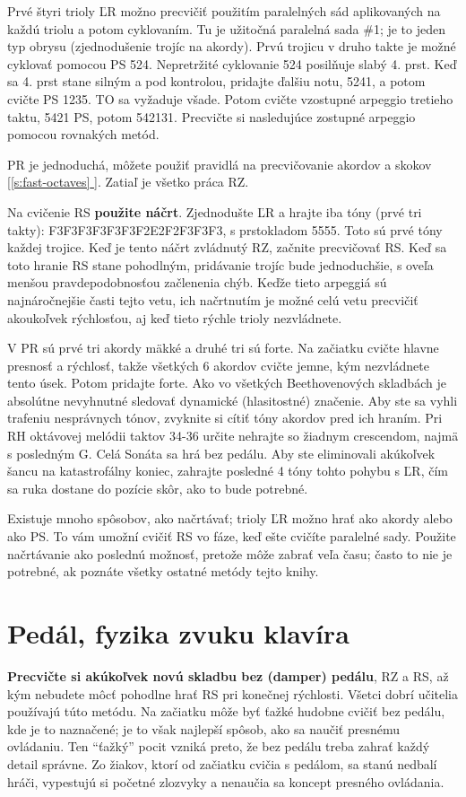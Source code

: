 \documentclass[11pt,a4paper]{book}
\newcommand*{\fullref}[1]{\hyperref[{#1}]{\ref*{#1} \nameref*{#1}}} %
\newcommand*{\fullrefp}[1]{[\fullref{#1}]} %
\begin{document}
Prvé štyri trioly ĽR možno precvičiť použitím paralelných sád aplikovaných na každú triolu a potom cyklovaním. Tu je užitočná paralelná sada \#1; je to jeden typ obrysu (zjednodušenie trojíc na akordy). Prvú trojicu v druho  takte je možné cyklovať pomocou PS 524. Nepretržité cyklovanie 524 posilňuje slabý 4. prst. Keď sa 4. prst stane silným a pod kontrolou, pridajte ďalšiu notu, 5241, a potom cvičte PS 1235. TO sa vyžaduje všade. Potom cvičte vzostupné arpeggio tretieho taktu, 5421 PS, potom 542131. Precvičte si nasledujúce zostupné arpeggio pomocou rovnakých metód.

PR je jednoduchá, môžete použiť pravidlá na precvičovanie akordov a skokov \fullrefp{s:fast-octaves}. Zatiaľ je všetko práca RZ.

Na cvičenie RS \textbf{použite náčrt}. Zjednodušte ĽR a hrajte iba tóny (prvé tri takty): F3F3F3F3\textbar F3F3F2E2\textbar F2F3F3F3, s prstokladom 5555. Toto sú prvé tóny každej trojice. Keď je tento náčrt zvládnutý RZ, začnite precvičovať RS. Keď sa toto hranie RS stane pohodlným, pridávanie trojíc bude jednoduchšie, s oveľa menšou pravdepodobnosťou začlenenia chýb. Keďže tieto arpeggiá sú najnáročnejšie časti tejto vetu, ich načrtnutím je možné celú vetu precvičiť akoukoľvek rýchlosťou, aj keď tieto rýchle trioly nezvládnete.

V PR sú prvé tri akordy mäkké a druhé tri sú forte. Na začiatku cvičte hlavne presnosť a rýchlosť, takže všetkých 6 akordov cvičte jemne, kým nezvládnete tento úsek. Potom pridajte forte. Ako vo všetkých Beethovenových skladbách je absolútne nevyhnutné sledovať dynamické (hlasitostné) značenie. Aby ste sa vyhli trafeniu nesprávnych tónov, zvyknite si cítiť tóny akordov pred ich hraním. Pri RH oktávovej melódii taktov 34-36 určite nehrajte so žiadnym crescendom, najmä s posledným G. Celá Sonáta sa hrá bez pedálu. Aby ste eliminovali akúkoľvek šancu na katastrofálny koniec, zahrajte posledné 4 tóny tohto pohybu s ĽR, čím sa ruka dostane do pozície skôr, ako to bude potrebné.

Existuje mnoho spôsobov, ako načrtávať; trioly ĽR možno hrať ako akordy alebo ako PS. To vám umožní cvičiť RS vo fáze, keď ešte cvičíte paralelné sady. Použite načrtávanie ako poslednú možnosť, pretože môže zabrať veľa času; často to nie je potrebné, ak poznáte všetky ostatné metódy tejto knihy.

\section{Pedál, fyzika zvuku klavíra}\label{s:damper-pedal}
\textbf{Precvičte si akúkoľvek novú skladbu bez (damper) pedálu}, RZ a RS, až kým nebudete môcť pohodlne hrať RS pri konečnej rýchlosti. Všetci dobrí učitelia používajú túto metódu. Na začiatku môže byť ťažké hudobne cvičiť bez pedálu, kde je to naznačené; je to však najlepší spôsob, ako sa naučiť presnému ovládaniu. Ten “ťažký” pocit vzniká preto, že bez pedálu treba zahrať každý detail správne. Zo žiakov, ktorí od začiatku cvičia s pedálom, sa stanú nedbalí hráči, vypestujú si početné zlozvyky a nenaučia sa koncept presného ovládania.
\end{document}
